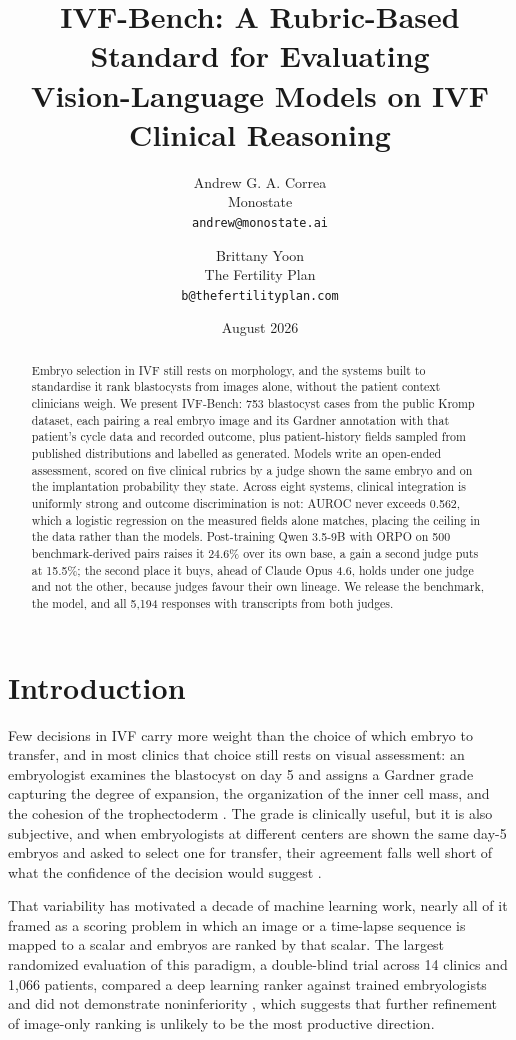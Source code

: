 \documentclass[11pt]{article}
\title{\textbf{IVF-Bench: A Rubric-Based Standard for Evaluating\\Vision-Language Models on IVF Clinical Reasoning}}
\author{
  Andrew G. A. Correa\\Monostate\\\texttt{andrew@monostate.ai}
  \and
  Brittany Yoon\\The Fertility Plan\\\texttt{b@thefertilityplan.com}
}
\date{August 2026}
\begin{document}
\maketitle

\begin{abstract}
Embryo selection in {IVF} still rests on morphology, and the systems built to
standardise it rank blastocysts from images alone, without the patient context
clinicians weigh. We present IVF-Bench: 753 blastocyst cases from the public
Kromp dataset, each pairing a real embryo image and its Gardner annotation with
that patient's cycle data and recorded outcome, plus patient-history fields
sampled from published distributions and labelled as generated. Models write an
open-ended assessment, scored on five clinical rubrics by a judge shown the same
embryo and on the implantation probability they state. Across eight systems,
clinical integration is uniformly strong and outcome discrimination is not:
{AUROC} never exceeds 0.562, which a logistic regression on the measured fields
alone matches, placing the ceiling in the data rather than the models.
Post-training Qwen 3.5-9B with {ORPO} on 500 benchmark-derived pairs raises it
24.6\% over its own base, a gain a second judge puts at 15.5\%; the second place
it buys, ahead of Claude Opus 4.6, holds under one judge and not the other,
because judges favour their own lineage. We release the benchmark, the model, and
all 5,194 responses with transcripts from both judges.
\end{abstract}

\section{Introduction}

Few decisions in IVF carry more weight than the choice of which embryo to
transfer, and in most clinics that choice still rests on visual assessment: an
embryologist examines the blastocyst on day 5 and assigns a Gardner grade
capturing the degree of expansion, the organization of the inner cell mass, and
the cohesion of the trophectoderm \citep{gardner1999}. The grade is clinically
useful, but it is also subjective, and when embryologists at different centers
are shown the same day-5 embryos and asked to select one for transfer, their
agreement falls well short of what the confidence of the decision would
suggest \citep{storr2017}.

That variability has motivated a decade of machine learning work, nearly all of
it framed as a scoring problem in which an image or a time-lapse sequence is
mapped to a scalar and embryos are ranked by that scalar. The largest randomized
evaluation of this paradigm, a double-blind trial across 14 clinics and 1,066
patients, compared a deep learning ranker against trained embryologists and did
not demonstrate noninferiority \citep{illingworth2024}, which suggests that
further refinement of image-only ranking is unlikely to be the most productive
direction.
\end{document}

